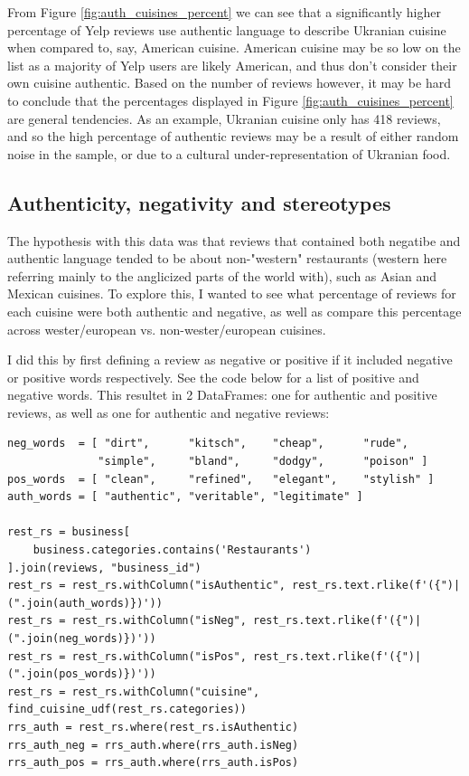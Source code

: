 From Figure \ref{fig:auth_cuisines_percent} we can see that a significantly higher percentage of Yelp reviews use authentic language to describe Ukranian cuisine when compared to, say, American cuisine. American cuisine may be so low on the list as a majority of Yelp users are likely American, and thus don't consider their own cuisine authentic.
Based on the number of reviews however, it may be hard to conclude that the percentages displayed in Figure \ref{fig:auth_cuisines_percent} are general tendencies. As an example, Ukranian cuisine only has 418 reviews, and so the high percentage of authentic reviews may be a result of either random noise in the sample, or due to a cultural under-representation of Ukranian food.

\subsection{Authenticity, negativity and stereotypes}

The hypothesis with this data was that reviews that contained both negatibe and authentic language tended to be about non-"western" restaurants (western here referring mainly to the anglicized parts of the world with), such as Asian and Mexican cuisines. To explore this, I wanted to see what percentage of reviews for each cuisine were both authentic and negative, as well as compare this percentage across wester/european vs. non-wester/european cuisines.

I did this by first defining a review as negative or positive if it included negative or positive words respectively. See the code below for a list of positive and negative words. This resultet in 2 DataFrames: one for authentic and positive reviews, as well as one for authentic and negative reviews:

\begin{verbatim}
neg_words  = [ "dirt",      "kitsch",    "cheap",      "rude",
              "simple",     "bland",     "dodgy",      "poison" ]
pos_words  = [ "clean",     "refined",   "elegant",    "stylish" ]
auth_words = [ "authentic", "veritable", "legitimate" ]

rest_rs = business[
    business.categories.contains('Restaurants')
].join(reviews, "business_id")
rest_rs = rest_rs.withColumn("isAuthentic", rest_rs.text.rlike(f'({")|(".join(auth_words)})'))
rest_rs = rest_rs.withColumn("isNeg", rest_rs.text.rlike(f'({")|(".join(neg_words)})'))
rest_rs = rest_rs.withColumn("isPos", rest_rs.text.rlike(f'({")|(".join(pos_words)})'))
rest_rs = rest_rs.withColumn("cuisine", find_cuisine_udf(rest_rs.categories))
rrs_auth = rest_rs.where(rest_rs.isAuthentic)
rrs_auth_neg = rrs_auth.where(rrs_auth.isNeg)
rrs_auth_pos = rrs_auth.where(rrs_auth.isPos)
\end{verbatim}


